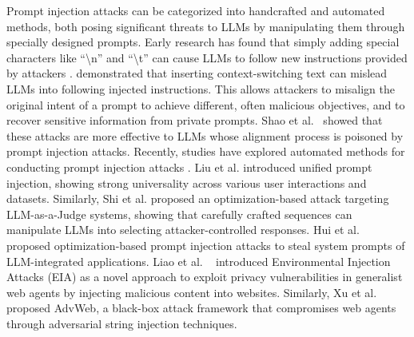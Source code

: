 Prompt injection attacks can be categorized into handcrafted and automated methods, both posing significant threats to LLMs by manipulating them through specially designed prompts. 
Early research has found that simply adding special characters like  ``\textbackslash n'' and ``\textbackslash t'' can cause LLMs to follow new instructions provided by attackers \cite{goodside2023prompt,harang2023securing}.
\cite{ignore_previous_prompt} demonstrated that inserting context-switching text can mislead LLMs into following injected instructions. This allows attackers to misalign the original intent of a prompt to achieve different, often malicious objectives, and to recover sensitive information from private prompts. Shao et al.~\cite{shao2024making} showed that these attacks are more effective to LLMs whose alignment process is poisoned by prompt injection attacks. Recently, studies have explored automated methods for conducting prompt injection attacks \cite{liu2024automaticuniversalpromptinjection,shi2024optimizationbasedpromptinjectionattack}. Liu et al. \cite{liu2024automaticuniversalpromptinjection} introduced unified prompt injection, showing strong universality across various user interactions and datasets. Similarly, Shi et al. \cite{shi2024optimizationbasedpromptinjectionattack} proposed an optimization-based attack targeting LLM-as-a-Judge systems, showing that carefully crafted sequences can manipulate LLMs into selecting attacker-controlled responses. Hui et al.~\cite{hui2024pleak} proposed optimization-based prompt injection attacks to steal system prompts of LLM-integrated applications. Liao et al. ~\cite{liao2024eia} introduced Environmental Injection Attacks (EIA) as a novel approach to exploit privacy vulnerabilities in generalist web agents by injecting malicious content into websites. Similarly, Xu et al.~\cite{xu2024advweb}  proposed AdvWeb, a black-box attack framework that compromises web agents through adversarial string injection techniques.

